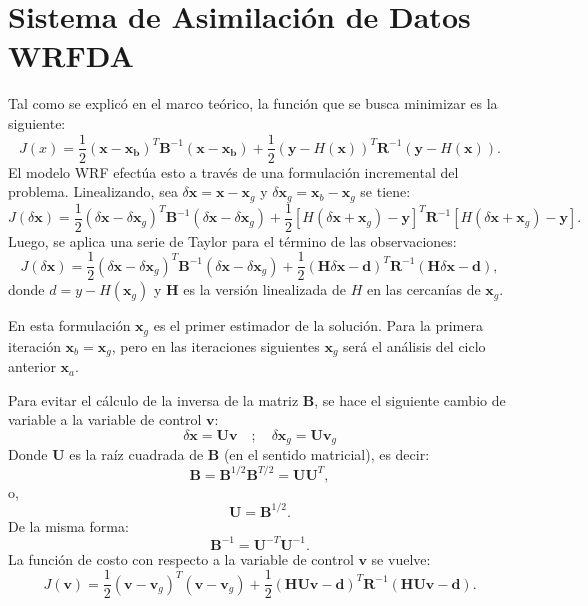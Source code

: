 \section{Sistema de Asimilación de Datos WRFDA}
Tal como se explicó en el marco teórico, la función que se busca minimizar es la siguiente:
\begin{equation}
J(x) = \frac{1}{2}(\mathbf{x}-\mathbf{x_b})^T\mathbf{B}^{-1}(\mathbf{x}-\mathbf{x_b}) + \frac{1}{2}(\mathbf{y}-H(\mathbf{x}))^T \mathbf{R}^{-1}(\mathbf{y}-H(\mathbf{x})).
\end{equation}
El modelo WRF efectúa esto a través de una formulación incremental del problema. Linealizando, sea $\delta \mathbf{x}=\mathbf{x} - \mathbf{x}_g$ y $\delta \mathbf{x}_g=\mathbf{x}_b - \mathbf{x}_g$ se tiene:
\begin{equation}
	J(\delta \mathbf{x}) = \frac{1}{2}(\delta \mathbf{x}- \delta \mathbf{x}_g)^T\mathbf{B}^{-1}(\delta \mathbf{x} - \delta \mathbf{x}_g) + \frac{1}{2}[H(\delta \mathbf{x} + \mathbf{x}_g)-\mathbf{y}]^T \mathbf{R}^{-1}[H(\delta \mathbf{x} + \mathbf{x}_g)-\mathbf{y}].
\end{equation}
Luego, se aplica una serie de Taylor para el término de las observaciones:
\begin{equation}
J(\delta \mathbf{x}) = \frac{1}{2}(\delta \mathbf{x}- \delta \mathbf{x}_g)^T\mathbf{B}^{-1}(\delta \mathbf{x} - \delta \mathbf{x}_g) + \frac{1}{2}(\mathbf{H} \delta \mathbf{x} -\textbf{d})^T \mathbf{R}^{-1}(\mathbf{H}\delta \mathbf{x} -\textbf{d}),
\end{equation}
donde $d=y-H(\textbf{x}_g )$ y $\textbf{H}$ es la versión linealizada de $H$ en las cercanías de $\textbf{x}_g$.

En esta formulación $\textbf{x}_g$ es el primer estimador de la solución. Para la primera iteración $\textbf{x}_b=\textbf{x}_g$, pero en las iteraciones siguientes $\textbf{x}_g$ será el análisis del ciclo anterior $\textbf{x}_a$.

Para evitar el cálculo de la inversa de la matriz $\textbf{B}$, se hace el siguiente cambio de variable a la variable de control $\textbf{v}$:
\begin{equation}
	\delta \mathbf{x}=\textbf{U}\textbf{v}\quad;\quad \delta \mathbf{x}_g=\textbf{U}\textbf{v}_g 
\end{equation}
Donde $\textbf{U}$ es la raíz cuadrada de $\textbf{B}$ (en el sentido matricial), es decir:
\begin{equation}
\textbf{B}=\textbf{B}^{1/2}\textbf{B}^{T/2} = \textbf{U}\textbf{U}^{T},
\end{equation}
o,
\begin{equation}
\textbf{U}=\textbf{B}^{1/2}.
\end{equation}
De la misma forma:
\begin{equation}
\textbf{B}^{-1} = \textbf{U}^{-T}\textbf{U}^{-1}.
\end{equation}
La función de costo con respecto a la variable de control $\textbf{v}$ se vuelve:
\begin{equation}
J(\mathbf{v}) = \frac{1}{2}(\mathbf{v}- \mathbf{v}_g)^T(\mathbf{v} - \mathbf{v}_g) + \frac{1}{2}(\mathbf{H} \mathbf{U}\mathbf{v} -\textbf{d})^T \mathbf{R}^{-1}(\mathbf{H}\mathbf{U}\mathbf{v} -\textbf{d}).
\end{equation}
